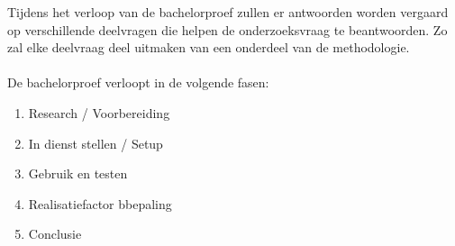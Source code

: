 Tijdens het verloop van de bachelorproef zullen er antwoorden worden vergaard op verschillende deelvragen die helpen de onderzoeksvraag te beantwoorden. Zo zal elke deelvraag deel uitmaken van een onderdeel van de methodologie.
\\\\
De bachelorproef verloopt in de volgende fasen:

\begin{enumerate}
  \item Research / Voorbereiding
  \item In dienst stellen / Setup
  \item Gebruik en testen
  \item Realisatiefactor bbepaling
  \item Conclusie
\end{enumerate}

